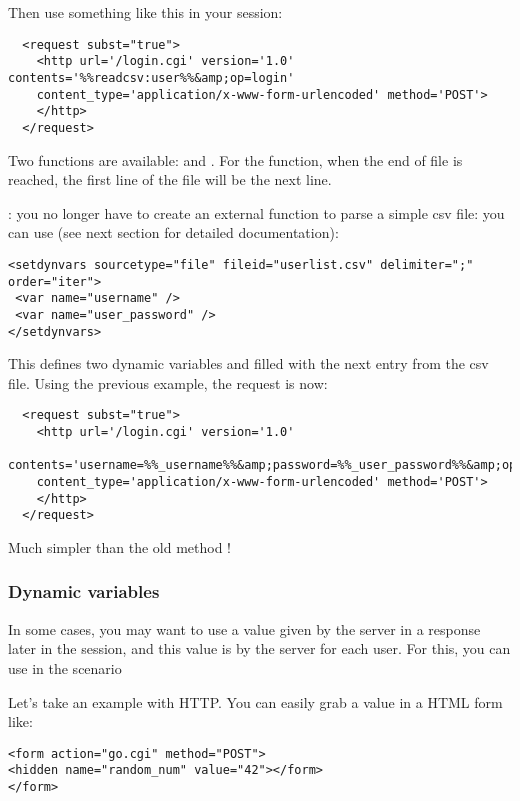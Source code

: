 \documentclass{TSUNG-en}
\begin{document}
Then use something like this in your session:

\begin{Verbatim}
  <request subst="true">
    <http url='/login.cgi' version='1.0' contents='%%readcsv:user%%&amp;op=login'
    content_type='application/x-www-form-urlencoded' method='POST'>
    </http>
  </request>
\end{Verbatim}

Two functions are available: 
and . For the
 function, when the end of file is reached, the
first line of the file will be the next line.

: you no longer have to create an external
function to parse a simple csv file: you can use 
(see next section for detailed documentation):

\begin{Verbatim}
<setdynvars sourcetype="file" fileid="userlist.csv" delimiter=";" order="iter">
 <var name="username" />
 <var name="user_password" />
</setdynvars>
\end{Verbatim}

This defines two dynamic variables  and
 filled with the next entry from the csv
file. Using the previous example, the request is now:
\begin{Verbatim}
  <request subst="true">
    <http url='/login.cgi' version='1.0'
      contents='username=%%_username%%&amp;password=%%_user_password%%&amp;op=login'
    content_type='application/x-www-form-urlencoded' method='POST'>
    </http>
  </request>
\end{Verbatim}

Much simpler than the old method !

\subsubsection{Dynamic variables}

In some cases, you may want to use a value given by the server in a
response later in the session, and this value is  by the server for each user. For this, you can use
 in the scenario

Let's take an example with HTTP. You can easily grab a value in a HTML
form like:
\begin{Verbatim}
<form action="go.cgi" method="POST">
<hidden name="random_num" value="42"></form>
</form>
\end{Verbatim}
\end{document}
